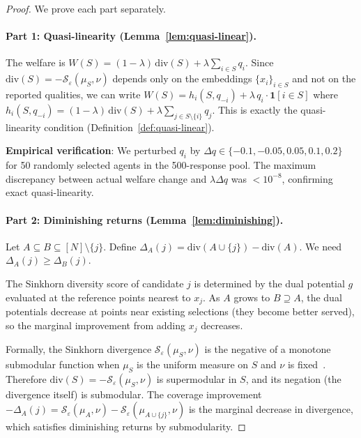 \documentclass[10pt]{article}
\begin{document}
\begin{proof}
We prove each part separately.

\paragraph{Part 1: Quasi-linearity (Lemma~\ref{lem:quasi-linear}).}
The welfare is $W(S) = (1-\lambda)\,\mathrm{div}(S) + \lambda\sum_{i \in S} q_i$.
Since $\mathrm{div}(S) = -\mathcal{S}_\varepsilon(\mu_S, \nu)$ depends only on the embeddings $\{x_i\}_{i \in S}$ and not on the reported qualities, we can write
$W(S) = h_i(S, q_{-i}) + \lambda\, q_i \cdot \mathbf{1}[i \in S]$
where $h_i(S, q_{-i}) = (1-\lambda)\,\mathrm{div}(S) + \lambda\sum_{j \in S \setminus \{i\}} q_j$.
This is exactly the quasi-linearity condition (Definition~\ref{def:quasi-linear}).

\textbf{Empirical verification}: We perturbed $q_i$ by $\Delta q \in \{-0.1, -0.05, 0.05, 0.1, 0.2\}$ for 50 randomly selected agents in the 500-response pool. The maximum discrepancy between actual welfare change and $\lambda \Delta q$ was $< 10^{-8}$, confirming exact quasi-linearity.

\paragraph{Part 2: Diminishing returns (Lemma~\ref{lem:diminishing}).}
Let $A \subseteq B \subseteq [N] \setminus \{j\}$.
Define $\Delta_A(j) = \mathrm{div}(A \cup \{j\}) - \mathrm{div}(A)$.
We need $\Delta_A(j) \geq \Delta_B(j)$.

The Sinkhorn diversity score of candidate $j$ is determined by the dual potential $g$ evaluated at the reference points nearest to $x_j$.
As $A$ grows to $B \supseteq A$, the dual potentials decrease at points near existing selections (they become better served), so the marginal improvement from adding $x_j$ decreases.

Formally, the Sinkhorn divergence $\mathcal{S}_\varepsilon(\mu_S, \nu)$ is the negative of a monotone submodular function when $\mu_S$ is the uniform measure on $S$ and $\nu$ is fixed~\citep{feydy2019interpolating}.
Therefore $\mathrm{div}(S) = -\mathcal{S}_\varepsilon(\mu_S, \nu)$ is supermodular in $S$, and its negation (the divergence itself) is submodular.
The coverage improvement $-\Delta_A(j) = \mathcal{S}_\varepsilon(\mu_A, \nu) - \mathcal{S}_\varepsilon(\mu_{A \cup \{j\}}, \nu)$ is the marginal decrease in divergence, which satisfies diminishing returns by submodularity.


\end{proof}
\end{document}

